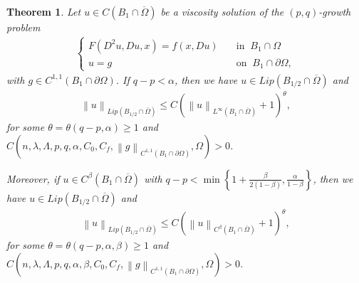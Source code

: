 \documentclass[reqno]{amsart}
\theoremstyle{plain}
\newtheorem{thm}{Theorem}[section]
\theoremstyle{definition}
\theoremstyle{remark}
\newcommand{\norm}[1]{\left\lVert#1\right\rVert}
\numberwithin{equation}{section}
\begin{document}
\begin{thm} \label{Bdy1}
    Let $u \in C(B_1\cap\overline{\Omega })$ be a viscosity solution of the $(p,q)$-growth problem
    \begin{align*}
        \begin{cases}
        F(D^2u,Du,x) = f(x,Du) \quad &\text{in } \ B_1\cap \Omega \\
        u=g\quad &\text{on } \ B_1\cap \partial \Omega,
        \end{cases}
    \end{align*}  with $g\in C^{1,1}(B_1\cap\partial\Omega)$.
    If $q-p<\alpha$, then we have $u \in Lip(B_{1/2} \cap \overline{\Omega})$ and
    \begin{align*}
        \norm{u}_{Lip(B_{1/2} \cap \overline{\Omega})} \leq C(\norm{u}_{L^\infty(B_1\cap\overline{\Omega})}+1)^\theta,
    \end{align*}
    for some $\theta= \theta(q-p,\alpha)\geq1$ and $C(n,\lambda, \Lambda, p,q,\alpha,C_0, C_f,\norm{g}_{C^{1,1}(B_1\cap\partial\Omega)},\Omega)>0$.
    
    Moreover, if $u \in C^\beta(B_1\cap\overline{ \Omega})$ with $q-p<\min \left\{1 + \frac{\beta}{2(1-\beta)}, \frac{\alpha}{1-\beta} \right\}$, then we have $u \in Lip(B_{1/2} \cap \overline{\Omega})$ and
    \begin{align*}
        \norm{u}_{Lip(B_{1/2} \cap \overline{\Omega})} \leq C(\norm{u}_{C^\beta(B_1\cap\overline{\Omega})}+1)^\theta,
    \end{align*}
    for some $\theta=\theta(q-p,\alpha,\beta)\geq1$ and $C(n,\lambda, \Lambda, p,q,\alpha,\beta,C_0, C_f,\norm{g}_{C^{1,1}(B_1\cap\partial\Omega)},\Omega)>0$.
\end{thm}
\end{document}
